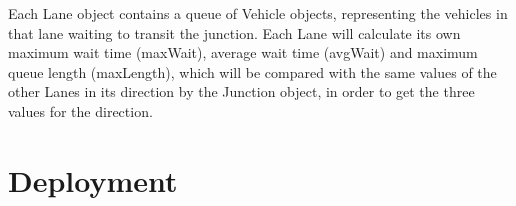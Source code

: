 \documentclass{article}
\begin{document}
Each Lane object contains a queue of Vehicle objects, representing the vehicles in that lane waiting to transit the junction. Each Lane will calculate its own maximum wait time (maxWait), average wait time (avgWait) and maximum queue length (maxLength), which will be compared with the same values of the other Lanes in its direction by the Junction object, in order to get the three values for the direction. 


\section{Deployment}
\end{document}
